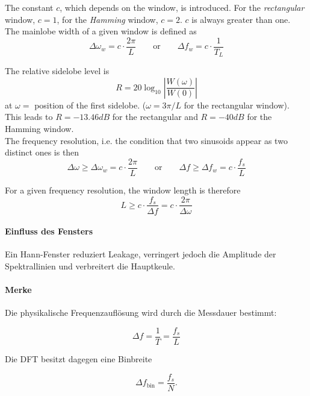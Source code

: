 The constant $c$, which depends on the window, is introduced. For the
\emph{rectangular} window, $c=1$, for the \emph{Hamming} window, $c=2$.
$c$ is always greater than one. \\

The mainlobe width of a given window is defined as
\begin{equation*}
	\Delta\omega_w = c \cdot \frac{2 \pi}{L} \qquad \text{or} \qquad \Delta f_w = c \cdot \frac{1}{T_L}
\end{equation*}

The relative sidelobe level is
\begin{equation*}
	R = 20 \log_{10} \left| \frac{W(\omega)}{W(0)} \right|
\end{equation*}
at $\omega = $ position of the first sidelobe. ($\omega=3\pi/L$ for the
rectangular window). This leads to $R = -13.46 dB$ for the rectangular
and $R = -40 dB$ for the Hamming window. \\

The frequency resolution, i.e. the condition that two sinusoids appear as
two distinct ones is then
\begin{equation*}
	 \Delta\omega \geq \Delta\omega_w = c \cdot \frac{2 \pi}{L}\qquad \text{or} \qquad \Delta f \geq \Delta f_w = c \cdot \frac{f_s}{L}
\end{equation*}

For a given frequency resolution, the window length is therefore
\begin{equation*}
	L \geq c \cdot \frac{f_s}{\Delta f} = c \cdot \frac{2 \pi}{\Delta \omega}
\end{equation*}

\paragraph{Einfluss des Fensters}

Ein Hann-Fenster reduziert Leakage,
verringert jedoch die Amplitude der Spektrallinien
und verbreitert die Hauptkeule.

\paragraph{Merke}
Die physikalische Frequenzauflösung wird durch die Messdauer bestimmt:

\[
\Delta f=\frac1T=\frac{f_s}{L}
\]

Die DFT besitzt dagegen eine Binbreite

\[
\Delta f_{\text{bin}}=\frac{f_s}{N}.
\]

